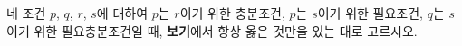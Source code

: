네 조건 $p$, $q$, $r$, $s$에 대하여 $p$는 $r$이기 위한 충분조건, $p$는 $s$이기 위한 필요조건, $q$는 $s$이기 위한 필요충분조건일 때, \textbf{보기}에서 항상 옳은 것만을 있는 대로 고르시오. 
